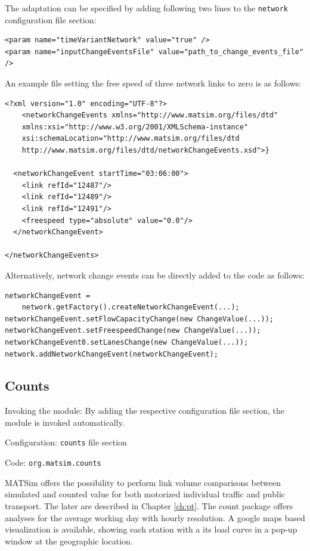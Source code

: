 The adaptation can be specified by adding following two lines to the \lstinline|network| configuration file section:
\begin{lstlisting}
<param name="timeVariantNetwork" value="true" />
<param name="inputChangeEventsFile" value="path_to_change_events_file" />
\end{lstlisting}
%
An example file setting the free speed of three network links to zero is as follows:
%
\begin{lstlisting}
<?xml version="1.0" encoding="UTF-8"?>
	<networkChangeEvents xmlns="http://www.matsim.org/files/dtd"
	xmlns:xsi="http://www.w3.org/2001/XMLSchema-instance"
	xsi:schemaLocation="http://www.matsim.org/files/dtd
	http://www.matsim.org/files/dtd/networkChangeEvents.xsd">}

  <networkChangeEvent startTime="03:06:00">
    <link refId="12487"/>
    <link refId="12489"/>
    <link refId="12491"/>
    <freespeed type="absolute" value="0.0"/>
  </networkChangeEvent>

</networkChangeEvents>
\end{lstlisting}
%
Alternatively, network change events can be directly added to the code as follows:
\begin{lstlisting}
networkChangeEvent =
	network.getFactory().createNetworkChangeEvent(...);
networkChangeEvent.setFlowCapacityChange(new ChangeValue(...));
networkChangeEvent.setFreespeedChange(new ChangeValue(...));
networkChangeEvent0.setLanesChange(new ChangeValue(...));
network.addNetworkChangeEvent(networkChangeEvent);
\end{lstlisting}

\subsection{Counts}
\label{sec:counts}
\begin{compactitem}
\item Invoking the module: By adding the respective configuration file section, the module is invoked automatically.
\item Configuration: \lstinline|counts| file section
\item Code: \lstinline|org.matsim.counts|
\end{compactitem}

MATSim offers the possibility to perform link volume comparisons between simulated and counted value for both motorized individual traffic \citep{Horni_unpub_IVT_2007}  and public transport. The later are described in Chapter \ref{ch:pt}. The count package offers analyses for the average working day with hourly resolution. A google maps based visualization is available, showing each station with a its load curve in a pop-up window at the geographic location.

